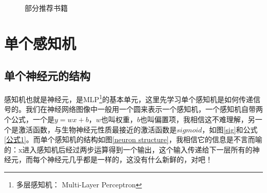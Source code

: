 \documentclass[a5paper, 11pt, openany]{book}
\begin{document}
\begin{figure}[ht]
    \centering
    \caption{部分推荐书籍}
\end{figure}

\chapter{单个感知机} \label{单个感知机}

\section{单个神经元的结构}
感知机也就是神经元，是MLP\footnote{多层感知机： Multi-Layer Perceptron}的基本单元，这里先学习单个感知机是如何传递信号的。我们在神经网络图像中一般用一个圆来表示一个感知机，一个感知机自带两个公式，一个是$y=wx+b$，$w$也叫权重，$b$也叫偏置项，我相信这不难理解，另一个是激活函数，\label{为什么用sigmoid}与生物神经元性质最接近的激活函数是$sigmoid$，如图\ref{sig}和公式\ref{公式1}。而单个感知机的结构如图\ref{neuron structure}，我相信它的信息是不言而喻的：x进入感知机后经过两步运算得到一个输出，这个输入传递给下一层所有的神经元，而每个神经元几乎都是一样的，这没有什么新鲜的，对吧！
\end{document}
